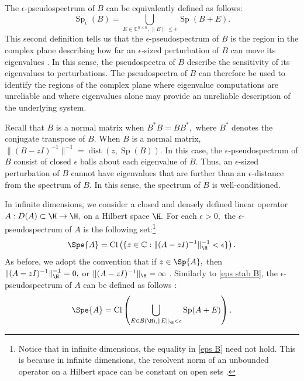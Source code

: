 The $\epsilon$-pseudospectrum of $B$ can be equivalently defined as follows:
\begin{equation} \label{eps stab B}
    \operatorname{Sp}_{\epsilon}(B) = \bigcup_{E \in \mathbb{C}^{n\times n}, \|E\| \le \epsilon} \operatorname{Sp}(B+E).
\end{equation}
This second definition tells us that the $\epsilon$-pseudospectrum of $B$ is the region in the complex plane describing how far an $\epsilon$-sized perturbation of $B$ can move its eigenvalues \cite{Matt}. In this sense, the pseudospectra of $B$ describe the sensitivity of its eigenvalues to perturbations. The pseudospectra of $B$ can therefore be used to identify the regions of the complex plane where eigenvalue computations are unreliable and where eigenvalues alone may provide an unreliable description of the underlying system.

Recall that $B$ is a normal matrix when $B^*B=BB^*,$ where $B^*$ denotes the conjugate transpose of $B.$ When $B$ is a normal matrix, $\|(B-zI)^{-1}\|^{-1} = \operatorname{dist}(z,\operatorname{Sp}(B)).$ In this case, the $\epsilon$-pseudospectrum of $B$ consist of closed $\epsilon$ balls about each eigenvalue of $B.$ Thus, an $\epsilon$-sized perturbation of $B$ cannot have eigenvalues that are further than an $\epsilon$-distance from the spectrum of $B.$ In this sense, the spectrum of $B$ is well-conditioned.  


In infinite dimensions, we consider a closed and densely defined linear operator $A : D(A) \subset \H \rightarrow 
\H,$ on a Hilbert space $\H.$ For each $\epsilon>0,$ the $\epsilon$-pseudospectrum of $A$ is the following set:\footnote{Notice that in infinite dimensions, the equality in \eqref{eps B} need not hold. This is because in infinite dimensions, the resolvent norm of an unbounded operator on a Hilbert space can be constant on open sets \cite{Matt}.}
\begin{equation}
    \Spe{A} = \operatorname{Cl}\left( \{ z \in \mathbb{C} : \|(A-zI)^{-1}\|_{\H}^{-1} < \epsilon \}  \right).
\end{equation}
As before, we adopt the convention that if $z \in \Sp{A},$ then $\|(A-zI)^{-1}\|_{\H}^{-1} = 0,$ or $\|(A-zI)^{-1}\|_{\H} = \infty$ \cite{Matt, Nick}.
Similarly to \eqref{eps stab B}, the $\epsilon$-pseudospectrum of $A$ can be defined as follows \cite{Matt, Nick}:
\begin{equation} 
    \Spe{A} = \operatorname{Cl} \left( \bigcup_{E \in \mathcal{B}(\H), \|E\|_\H < \epsilon} \operatorname{Sp}(A+E) \right).
\end{equation}

